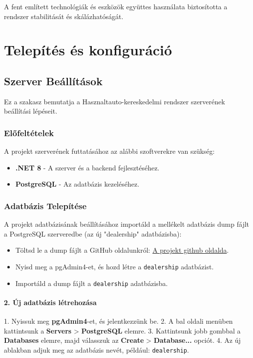 \documentclass{report}[11pt]
\begin{document}
A fent említett technológiák és eszközök együttes használata biztosította a rendszer stabilitását és skálázhatóságát.


    \chapter{Telepítés és konfiguráció}
    \section{Szerver Beállítások}
    
Ez a szakasz bemutatja a Hasznaltauto-kereskedelmi rendszer szerverének beállítási lépéseit.

\subsection{Előfeltételek}
A projekt szerverének futtatásához az alábbi szoftverekre van szükség:
\begin{itemize}
    \item \textbf{.NET 8} - A szerver és a backend fejlesztéséhez.
    \item \textbf{PostgreSQL} - Az adatbázis kezeléséhez.
\end{itemize}

\subsection{Adatbázis Telepítése}
A projekt adatbázisának beállításához importáld a mellékelt adatbázis dump fájlt a PostgreSQL szerveredbe (az új "dealership" adatbázisba):
\begin{itemize}
    \item Töltsd le a dump fájlt a GitHub oldalunkról: \href{https://github.com/suketti/CarDealershipSystem}{A projekt github oldalda}.
    \item Nyisd meg a pgAdmin4-et, és hozd létre a \texttt{dealership} adatbázist.
    \item Importáld a dump fájlt a \texttt{dealership} adatbázisba.
\end{itemize}

\subsubsection{2. Új adatbázis létrehozása}

1. Nyissuk meg \textbf{pgAdmin4}-et, és jelentkezzünk be.
2. A bal oldali menüben kattintsunk a \textbf{Servers} > \textbf{PostgreSQL} elemre.
3. Kattintsunk jobb gombbal a \textbf{Databases} elemre, majd válasszuk az \textbf{Create} > \textbf{Database...} opciót.
4. Az új ablakban adjuk meg az adatbázis nevét, például: \texttt{dealership}.
\end{document}
